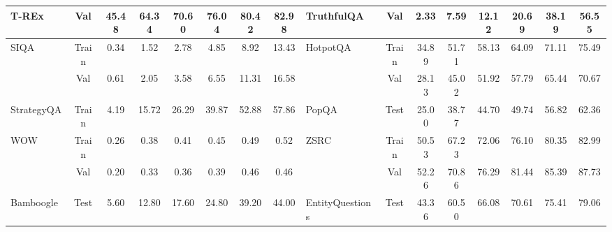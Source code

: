 \begin{table*}[h!]
{\begin{tabular}{@{}lccccccc|lccccccc@{}}
\multirow{1}{*}{T-REx~\cite{trex,kilt_2021}}
& Val & 45.48 & 64.34 & 70.60 & 76.04 & 80.42 & 82.98
& \multirow{1}{*}{TruthfulQA~\cite{truthfulqa}}
& Val & 2.33 & 7.59 & 12.12 & 20.69 & 38.19 & 56.55 \\ 
\midrule

\multirow{2}{*}{SIQA~\cite{siqa}}
& Train & 0.34 & 1.52 & 2.78 & 4.85 & 8.92 & 13.43
& \multirow{2}{*}{HotpotQA~\cite{hotpotqa}}
& Train & 34.89 & 51.71 & 58.13 & 64.09 & 71.11 & 75.49 \\ 
& Val & 0.61 & 2.05 & 3.58 & 6.55 & 11.31 & 16.58
&
& Val & 28.13 & 45.02 & 51.92 & 57.79 & 65.44 & 70.67 \\ 
\midrule

\multirow{1}{*}{StrategyQA~\cite{geva-etal-2021-aristotle}}
& Train & 4.19 & 15.72 & 26.29 & 39.87 & 52.88 & 57.86
& \multirow{1}{*}{PopQA~\cite{popqa}}
& Test & 25.00 & 38.77 & 44.70 & 49.74 & 56.82 & 62.36 \\ 
\midrule

\multirow{2}{*}{WOW~\cite{dinan2018wizard,kilt_2021}}
& Train & 0.26 & 0.38 & 0.41 & 0.45 & 0.49 & 0.52
& \multirow{2}{*}{ZSRC~\cite{levy-etal-2017-zero}}
& Train & 50.53 & 67.23 & 72.06 & 76.10 & 80.35 & 82.99 \\ 
& Val & 0.20 & 0.33 & 0.36 & 0.39 & 0.46 & 0.46
&
& Val & 52.26 & 70.86 & 76.29 & 81.44 & 85.39 & 87.73 \\ 
\midrule

\multirow{1}{*}{Bamboogle~\cite{selfask_2023}}
& Test & 5.60 & 12.80 & 17.60 & 24.80 & 39.20 & 44.00
& \multirow{1}{*}{EntityQuestions~\cite{sciavolino2021simple}}
& Test & 43.36 & 60.50 & 66.08 & 70.61 & 75.41 & 79.06 \\

\bottomrule
\end{tabular}
}
\label{tab:bm25_results}
\end{table*}

